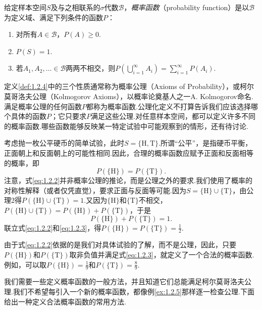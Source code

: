 \begin{definition}\label{def:1.2.4}
给定样本空间$S$及与之相联系的$\sigma$代数$\mathscr B$，\emph{概率函数}（probability function）是以$\mathscr B$为定义域、满足下列条件的函数$P$：
\begin{enumerate}[label=\arabic*.]
\item 对所有$A\in\mathscr B$，$P(A)\ge0$.
\item $P(S)=1$.
\item 若$A_1,A_2,\ldots\in\mathscr B$两两不相交，则$P(\bigcup_{i=1}^{\infty}A_i)=\sum_{i=1}^{\infty}P(A_i)$.
\end{enumerate}
\end{definition}
定义\ref{def:1.2.4}中的三个性质通常称为概率公理（Axioms of Probability），或柯尔莫哥洛夫公理（Kolmogorov Axioms），以概率论奠基人之一A. Kolmogorov命名.满足概率公理的任何函数$P$都称为概率函数.公理化定义不打算告诉我们应该选择哪个具体的函数$P$；它只要求$P$满足这些公理.对任意样本空间，都可以定义许多不同的概率函数.哪些函数能够反映某一特定试验中可能观察到的情形，还有待讨论.
\begin{example}[定义概率——I]\label{ex:1.2.5}
考虑抛一枚公平硬币的简单试验，此时$S=\{\mathrm H,\mathrm T\}$.所谓“公平”，是指硬币平衡，正面朝上和反面朝上的可能性相同.因此，合理的概率函数应赋予正面和反面相等的概率，即
\begin{equation}\label{eq:1.2.2}
P(\{\mathrm H\})=P(\{\mathrm T\}).
\end{equation}
注意，式\eqref{eq:1.2.2}并非概率公理的推论，而是公理之外的要求.我们使用了概率的对称性解释（或者仅凭直觉），要求正面与反面等可能.因为$S=\{\mathrm H\}\cup\{\mathrm T\}$，由公理2得$P(\{\mathrm H\}\cup\{\mathrm T\})=1$.又因为$\{\mathrm H\}$和$\{\mathrm T\}$不相交，$P(\{\mathrm H\}\cup\{\mathrm T\})=P(\{\mathrm H\})+P(\{\mathrm T\})$，于是
\begin{equation}\label{eq:1.2.3}
P(\{\mathrm H\})+P(\{\mathrm T\})=1.
\end{equation}
联立式\eqref{eq:1.2.2}和\eqref{eq:1.2.3}，得$P(\{\mathrm H\})=P(\{\mathrm T\})=\frac12$.

由于式\eqref{eq:1.2.2}依据的是我们对具体试验的了解，而不是公理，因此，只要$P(\{\mathrm H\})$和$P(\{\mathrm T\})$取非负值并满足式\eqref{eq:1.2.3}，就定义了一个合法的概率函数.例如，可以取$P(\{\mathrm H\})=\frac19$和$P(\{\mathrm T\})=\frac89$.
\end{example}
我们需要一些定义概率函数的一般方法，并且知道它们总能满足柯尔莫哥洛夫公理.我们不希望每引入一个新的概率函数，都像例\ref{ex:1.2.5}那样逐一检查公理.下面给出一种定义合法概率函数的常用方法.
